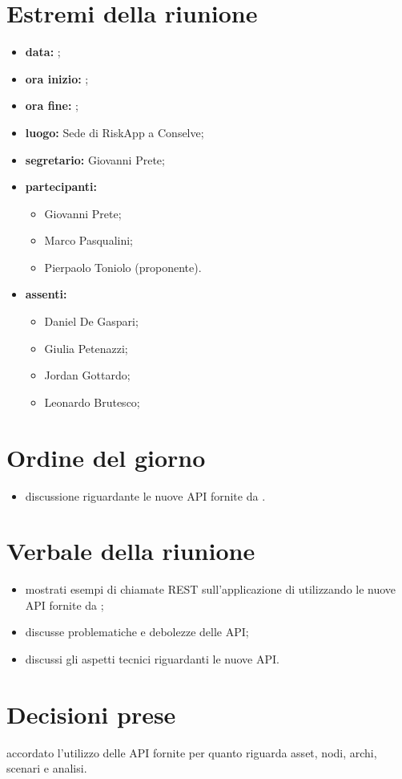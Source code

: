 \documentclass[a4paper,11pt]{article}
\begin{document}
	\section{Estremi della riunione}
	\begin{itemize}
		\item \textbf{data:} ;
		\item \textbf{ora inizio:} ;
		\item \textbf{ora fine:} ;
		\item \textbf{luogo:} Sede di RiskApp a Conselve;
		\item \textbf{segretario:} Giovanni Prete;
		\item \textbf{partecipanti:}
		\begin{itemize}
			 \item Giovanni Prete;
			 \item Marco Pasqualini;
			 \item Pierpaolo Toniolo (proponente).
		\end{itemize}
		\item \textbf{assenti:}
			\begin{itemize}
			 \item Daniel De Gaspari;
			 \item Giulia Petenazzi;
			 \item Jordan Gottardo;
			 \item Leonardo Brutesco;
			\end{itemize}
	\end{itemize}
	\section{Ordine del giorno}
		\begin{itemize}
			\item discussione riguardante le nuove API fornite da \riskapp.
		\end{itemize}
	\section{Verbale della riunione}
	\begin{itemize}
		\item mostrati esempi di chiamate REST sull'applicazione di \riskapp{} utilizzando le nuove API fornite da \riskapp;
		\item discusse problematiche e debolezze delle API;
		\item discussi gli aspetti tecnici riguardanti le nuove API.
	\end{itemize}
	\section{Decisioni prese}
	\begin{itemize}
		\itemVE accordato l'utilizzo delle API fornite per quanto riguarda asset, nodi, archi, scenari e analisi.
	\end{itemize}
\end{document}
